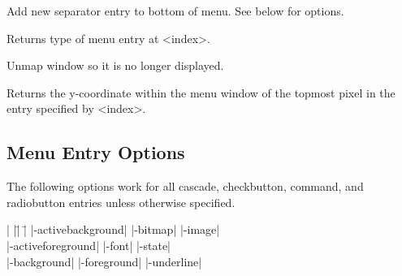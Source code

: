 \begin{enum}{1cm}
Add new separator entry to bottom of menu. See below for options.

Returns type of menu entry at <index>.

Unmap window so it is no longer displayed.

Returns the y-coordinate within the menu window of the topmost pixel
in the entry specified by <index>.

\end{enum}

\subsection*{Menu Entry Options}

The following options work for all cascade, checkbutton, command,
and radiobutton entries unless otherwise specified.

\begin{tabbing}
|                   |\=|                  |\= \kill
|-activebackground| \> |-bitmap|          \> |-image| \\
|-activeforeground| \> |-font|            \> |-state| \\
|-background|       \> |-foreground|      \> |-underline| \\
\end{tabbing}

